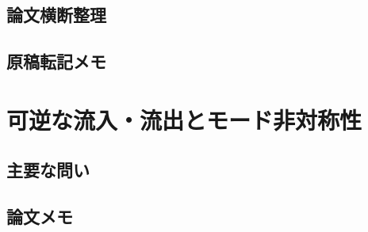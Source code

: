 \documentclass[11pt]{jsarticle}
\let\litsectionorig\section
\renewcommand{\section}{\clearpage\litsectionorig}
\begin{document}
\subsection*{論文横断整理}

\subsection*{原稿転記メモ}

\section{可逆な流入・流出とモード非対称性}

\subsection*{主要な問い}

\subsection*{論文メモ}
\end{document}
